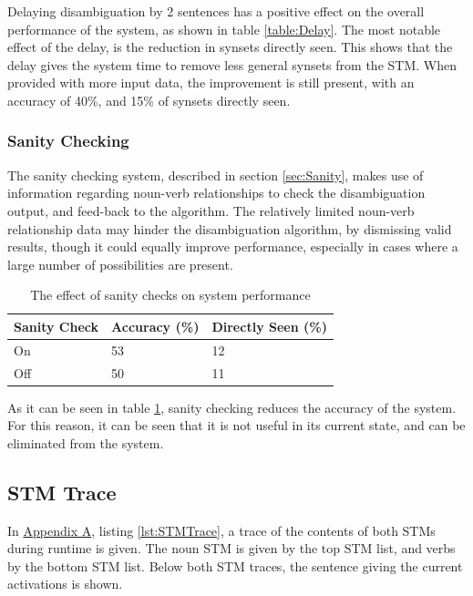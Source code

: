\documentclass[]{article}
\begin{document}
Delaying disambiguation by 2 sentences has a positive effect on the overall performance of the system, as shown in table \ref{table:Delay}. The most notable effect of the delay, is the reduction in synsets directly seen. This shows that the delay gives the system time to remove less general synsets from the STM. When provided with more input data, the improvement is still present, with an accuracy of 40\%, and 15\% of synsets directly seen.

\subsubsection{Sanity Checking} 
\label{sec:EvDisSanity}
The sanity checking system, described in section \ref{sec:Sanity}, makes use of information regarding noun-verb relationships to check the disambiguation output, and feed-back to the algorithm. The relatively limited noun-verb relationship data may hinder the disambiguation algorithm, by dismissing valid results, though it could equally improve performance, especially in cases where a large number of possibilities are present.

\begin{table}
\begin{center}
\begin{tabular}{|p{5em}|p{7em}|p{7em}|}
	\hline
	Sanity Check & Accuracy (\%) & Directly Seen (\%) \\
	\hline
	On & 53 & 12\\
	\hline
	Off & 50 & 11\\
	\hline
\end{tabular}
\end{center}
\caption{The effect of sanity checks on system performance}
\label{table:Sanity}
\end{table}

As it can be seen in table \ref{table:Sanity}, sanity checking reduces the accuracy of the system. For this reason, it can be seen that it is not useful in its current state, and can be eliminated from the system.

\subsection{STM Trace}
\label{sec:EvTrace}
In \hyperref[sec:AppA]{Appendix A}, listing \ref{lst:STMTrace}, a trace of the contents of both STMs during runtime is given. The noun STM is given by the top STM list, and verbs by the bottom STM list. Below both STM traces, the sentence giving the current activations is shown.
\end{document}
